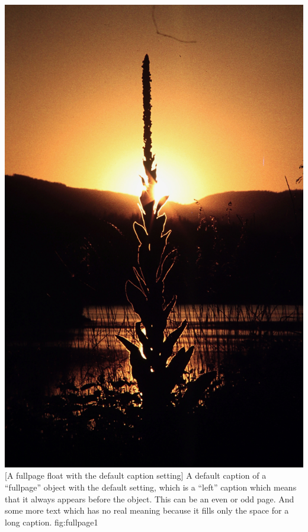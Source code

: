 \documentclass[twoside,twocolumn]{scrartcl}
\begin{document}
\Float[capPos=right]
%
  {\includegraphics[fullpage]{usa5}}%
  [A fullpage float with the default caption setting]%
  {A default caption of a ``fullpage'' object with the default setting, which
   is a ``left''  caption which means that it always appears before the object.
   This can be an even or odd page. And some more text which has no
   real meaning because it fills only the space for a long caption.}%
  {fig:fullpage1}

\blinddocument


\Blindtext \Blindtext
\end{document}
